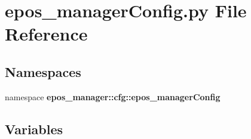 \section{epos\-\_\-manager\-Config.\-py \-File \-Reference}
\label{epos__managerConfig_8py}
\subsection*{\-Namespaces}
\begin{DoxyCompactItemize}
\item 
namespace {\bf epos\-\_\-manager\-::cfg\-::epos\-\_\-manager\-Config}
\end{DoxyCompactItemize}
\subsection*{\-Variables}
